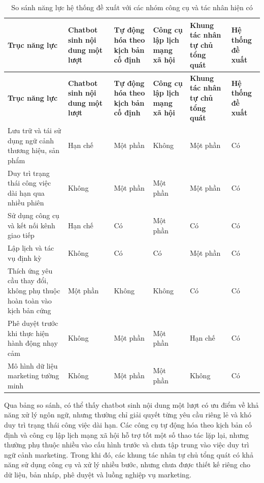 \documentclass[a4paper]{article}
\renewcommand{\arraystretch}{1.25}
\begin{document}
\renewcommand{\arraystretch}{1.25}\setlength{\tabcolsep}{3pt}
\begin{longtable}{L{0.20\textwidth}C{0.14\textwidth}C{0.14\textwidth}C{0.14\textwidth}C{0.14\textwidth}C{0.14\textwidth}}
\caption{So sánh năng lực hệ thống đề xuất với các nhóm công cụ và tác nhân hiện có}\label{tab:so-sanh-nang-luc}\\
\toprule
\textbf{Trục năng lực} & \textbf{Chatbot sinh nội dung một lượt} & \textbf{Tự động hóa theo kịch bản cố định} & \textbf{Công cụ lập lịch mạng xã hội} & \textbf{Khung tác nhân tự chủ tổng quát} & \textbf{Hệ thống đề xuất}\\
\midrule
\endfirsthead
\toprule
\textbf{Trục năng lực} & \textbf{Chatbot sinh nội dung một lượt} & \textbf{Tự động hóa theo kịch bản cố định} & \textbf{Công cụ lập lịch mạng xã hội} & \textbf{Khung tác nhân tự chủ tổng quát} & \textbf{Hệ thống đề xuất}\\
\midrule
\endhead
Lưu trữ và tái sử dụng ngữ cảnh thương hiệu, sản phẩm & Hạn chế & Một phần & Không & Một phần & Có\\
Duy trì trạng thái công việc dài hạn qua nhiều phiên & Không & Một phần & Một phần & Một phần & Có\\
Sử dụng công cụ và kết nối kênh giao tiếp & Hạn chế & Có & Một phần & Có & Có\\
Lập lịch và tác vụ định kỳ & Không & Có & Có & Một phần & Có\\
Thích ứng yêu cầu thay đổi, không phụ thuộc hoàn toàn vào kịch bản cứng & Một phần & Không & Không & Có & Có\\
Phê duyệt trước khi thực hiện hành động nhạy cảm & Không & Một phần & Một phần & Hạn chế & Có\\
Mô hình dữ liệu marketing tường minh & Không & Một phần & Một phần & Không & Có\\
\bottomrule
\end{longtable}
\renewcommand{\arraystretch}{1}\setlength{\tabcolsep}{6pt}

Qua bảng so sánh, có thể thấy chatbot sinh nội dung một lượt có ưu điểm về khả năng xử lý ngôn ngữ, nhưng thường chỉ giải quyết từng yêu cầu riêng lẻ và khó duy trì trạng thái công việc dài hạn. Các công cụ tự động hóa theo kịch bản cố định và công cụ lập lịch mạng xã hội hỗ trợ tốt một số thao tác lặp lại, nhưng thường phụ thuộc nhiều vào cấu hình trước và chưa tập trung vào việc duy trì ngữ cảnh marketing. Trong khi đó, các khung tác nhân tự chủ tổng quát có khả năng sử dụng công cụ và xử lý nhiều bước, nhưng chưa được thiết kế riêng cho dữ liệu, bản nháp, phê duyệt và luồng nghiệp vụ marketing.
\end{document}
